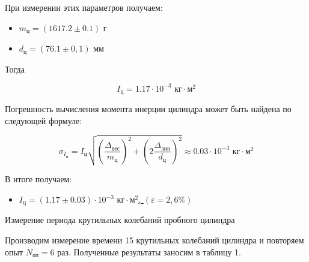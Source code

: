 \documentclass[12pt, a4paper]{article}
\begin{document}
При измерении этих параметров получаем:
\begin{itemize}
	\item $ m_\text{ц} = \left( 1617.2 \pm 0.1\right) $ г
	\item $ d_\text{ц} = \left( 76.1 \pm 0,1 \right) $ мм
\end{itemize}

Тогда

\begin{equation}
I_\text{ц} = 1.17 \cdot 10^{-3} \text{ кг} \cdot \text{м}^2
\end{equation}

Погрешность вычисления момента инерции цилиндра может быть найдена по следующей формуле:

\begin{equation}
\sigma_{I_\text{ц}} = I_\text{ц}\sqrt{\left( \frac{\Delta_\text{вес}}{m_\text{ц}} \right)^2 + \left(2 \frac{\Delta_\text{лин}}{d_\text{ц}} \right)^2 } \approx 0.03 \cdot 10^{-3} \text{ кг} \cdot \text{м}^2
\end{equation}

В итоге получаем:

\begin{itemize}
	\item \underline{$ I_\text{ц} = \left(1.17 \pm 0.03 \right) \cdot 10^{-3} \text{ кг} \cdot \text{м}^2 $, $ \left( \varepsilon = 2,6 \% \right) $}
\end{itemize}

{\large Измерение периода крутильных колебаний пробного цилиндра }

Производим измерение времени 15 крутильных колебаний цилиндра и повторяем опыт $ N_\text{оп} = 6 $ раз. Полученные результаты заносим в таблицу 1.
\end{document}
